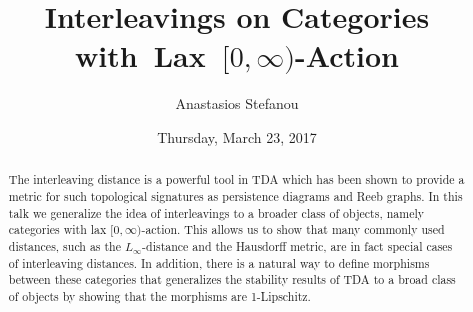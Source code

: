 \documentclass{UAmathtalk}
\author{Anastasios Stefanou}
\title{Interleavings on Categories with~Lax~\texorpdfstring{$[0,\infty)$}{[0,∞)}-Action}
\date{Thursday, March 23, 2017}
\begin{document}
\maketitle

\begin{abstract}
The interleaving distance is a powerful tool in TDA which has been shown to provide a metric for such topological signatures as persistence diagrams and Reeb graphs. In this talk we generalize the idea of interleavings to a broader class of objects, namely categories with lax $[0,\infty)$-action. This allows us to show that many commonly used distances, such as the $L_{\infty}$-distance and the Hausdorff metric, are in fact special cases of interleaving distances. In addition, there is a natural way to define morphisms between these categories that generalizes the stability results of TDA to a broad class of objects by showing that the morphisms are 1-Lipschitz.
\end{abstract}
\end{document}

